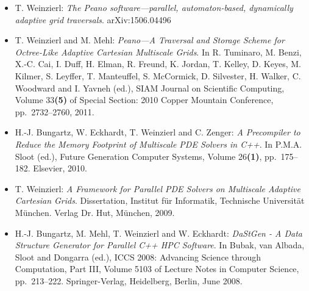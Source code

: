 \begin{itemize}
  \item T. Weinzierl: 
  {\em The {P}eano software---parallel,
   automaton-based, dynamically adaptive grid traversals}.
  arXiv:1506.04496
  \item 
  T. Weinzierl and M. Mehl: {\em Peano---A Traversal and Storage Scheme for
Octree-Like Adaptive Cartesian Multiscale Grids}.
In R. Tuminaro, M. Benzi, X.-C. Cai, I. Duff, H. Elman, R. Freund, K. Jordan, T.
Kelley, D. Keyes, M. Kilmer, S. Leyffer, T. Manteuffel, S. McCormick, D.
Silvester, H. Walker, C. Woodward and I. Yavneh (ed.), SIAM Journal on
Scientific Computing, Volume 33{\bf(5)} of Special Section: 2010 Copper Mountain
Conference, pp.~2732--2760, 2011.
  \item 
H.-J. Bungartz, W. Eckhardt, T. Weinzierl and C. Zenger: {\em A Precompiler to
Reduce the Memory Footprint of Multiscale PDE Solvers in C++}.
In P.M.A. Sloot (ed.), Future Generation Computer Systems, Volume 26{\bf (1)},
pp.~175--182. Elsevier, 2010.
  \item 
T. Weinzierl: {\em A Framework for Parallel PDE Solvers on Multiscale Adaptive
Cartesian Grids}.
Dissertation, Institut f\"ur Informatik, Technische Universit\"at M\"unchen. Verlag Dr. Hut, M\"unchen, 2009.
    \item 
H.-J. Bungartz, M. Mehl, T. Weinzierl and W. Eckhardt: {\em DaStGen - A Data
Structure Generator for Parallel C++ HPC Software}.
In Bubak, van Albada, Sloot and Dongarra (ed.), ICCS 2008: Advancing Science
through Computation, Part III, Volume 5103 of Lecture Notes in Computer Science,
pp.~213--222. Springer-Verlag, Heidelberg, Berlin, June 2008.
\end{itemize}
